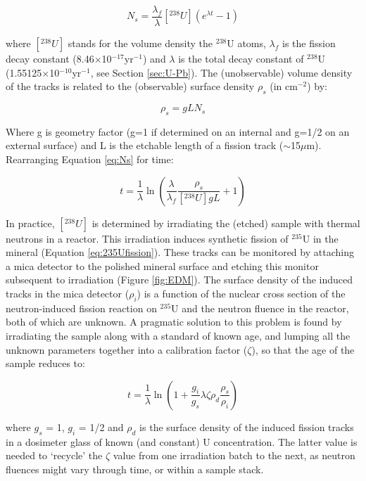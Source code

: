 \documentclass{book}
\begin{document}
\begin{equation}
N_{s} = \frac{\lambda_f}{\lambda} [^{238}U] \left(e^{\lambda t}-1\right)
\label{eq:Ns}
\end{equation}

where $[^{238}U]$ stands for the volume density the $^{238}$U atoms,
$\lambda_f$ is the fission decay constant
(8.46$\times$10$^{-17}$yr$^{-1}$) and $\lambda$ is the total decay
constant of $^{238}$U (1.55125$\times$10$^{-10}$yr$^{-1}$, see Section
\ref{sec:U-Pb}). The (unobservable) volume density of the tracks is
related to the (observable) surface density $\rho_s$ (in cm$^{-2}$)
by:

\begin{equation}
\rho_s = g L N_s
\label{eq:rhos}
\end{equation}

Where g is geometry factor (g=1 if determined on an internal and g=1/2
on an external surface) and L is the etchable length of a fission
track ($\sim$15$\mu$m). Rearranging Equation \ref{eq:Ns} for time:

\begin{equation}
t = \frac{1}{\lambda}
\ln\left(\frac{\lambda}{\lambda_f}\frac{\rho_s}{[^{238}U] g L
}+1\right)
\label{eq:tFT}
\end{equation}

In practice, $[^{238}U]$ is determined by irradiating the (etched)
sample with thermal neutrons in a reactor. This irradiation induces
synthetic fission of $^{235}$U in the mineral (Equation
\ref{eq:235Ufission}). These tracks can be monitored by attaching a
mica detector to the polished mineral surface and etching this monitor
subsequent to irradiation (Figure \ref{fig:EDM}). The surface density
of the induced tracks in the mica detector ($\rho_i$) is a function of
the nuclear cross section of the neutron-induced fission reaction on
$^{235}$U and the neutron fluence in the reactor, both of which are
unknown. A pragmatic solution to this problem is found by irradiating
the sample along with a standard of known age, and lumping all the
unknown parameters together into a calibration factor ($\zeta$), so
that the age of the sample reduces to:

\begin{equation}
t = \frac{1}{\lambda}\ln\left(1+\frac{g_i}{g_s}\lambda\zeta\rho_d\frac{\rho_s}{\rho_i}\right)
\label{eq:tzeta}
\end{equation}

where $g_s$ = 1, $g_i$ = 1/2 and $\rho_d$ is the surface density of
the induced fission tracks in a dosimeter glass of known (and
constant) U concentration. The latter value is needed to `recycle' the
$\zeta$ value from one irradiation batch to the next, as neutron
fluences might vary through time, or within a sample stack.\\
\end{document}
